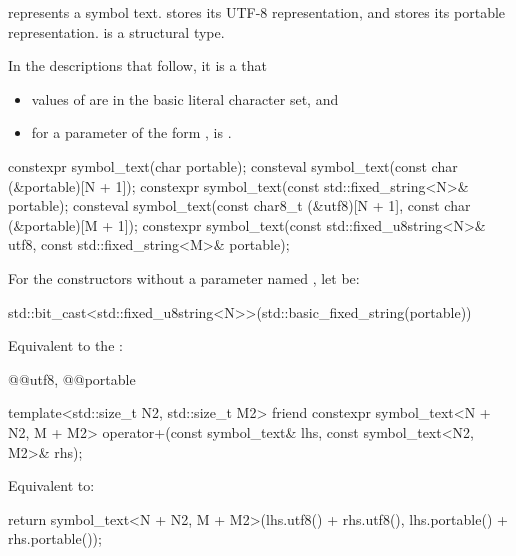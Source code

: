 \pnum
{} represents a symbol text.
 stores its UTF-8 representation, and
 stores its portable representation.
 is a structural type.

\pnum
In the descriptions that follow,
it is a  that
\begin{itemize}
\item
values of  are in the basic literal character set, and
\item
for a parameter of the form ,
 is .
\end{itemize}

\begin{itemdecl}
constexpr symbol_text(char portable);
consteval symbol_text(const char (&portable)[N + 1]);
constexpr symbol_text(const std::fixed_string<N>& portable);
consteval symbol_text(const char8_t (&utf8)[N + 1], const char (&portable)[M + 1]);
constexpr symbol_text(const std::fixed_u8string<N>& utf8, const std::fixed_string<M>& portable);
\end{itemdecl}

\begin{itemdescr}
\pnum
For the constructors without a parameter named ,
let  be:
\begin{codeblock}
std::bit_cast<std::fixed_u8string<N>>(std::basic_fixed_string(portable))
\end{codeblock}

\pnum
\effects
Equivalent to the :
\begin{codeblock}
@@{utf8}, @@{portable}
\end{codeblock}
\end{itemdescr}

\begin{itemdecl}
template<std::size_t N2, std::size_t M2>
friend constexpr symbol_text<N + N2, M + M2> operator+(const symbol_text& lhs,
                                                       const symbol_text<N2, M2>& rhs);
\end{itemdecl}

\begin{itemdescr}
\pnum
\effects
Equivalent to:
\begin{codeblock}
return symbol_text<N + N2, M + M2>(lhs.utf8() + rhs.utf8(),
                                   lhs.portable() + rhs.portable());
\end{codeblock}
\end{itemdescr}

